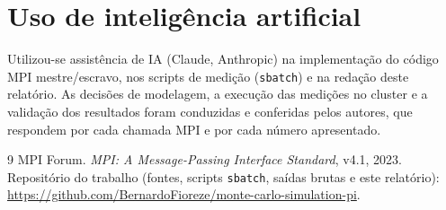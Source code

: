 \documentclass[10pt,twocolumn,a4paper]{article}
\begin{document}
\section{Uso de inteligência artificial}
Utilizou-se assistência de IA (Claude, Anthropic) na implementação do código MPI
mestre/escravo, nos scripts de medição (\texttt{sbatch}) e na redação deste
relatório. As decisões de modelagem, a execução das medições no cluster e a
validação dos resultados foram conduzidas e conferidas pelos autores, que respondem
por cada chamada MPI e por cada número apresentado.

\begin{thebibliography}{9}\footnotesize
{} MPI Forum. \emph{MPI: A Message-Passing Interface Standard}, v4.1, 2023.
 Repositório do trabalho (fontes, scripts \texttt{sbatch}, saídas brutas
e este relatório): \url{https://github.com/BernardoFioreze/monte-carlo-simulation-pi}.
\end{thebibliography}
\end{document}
